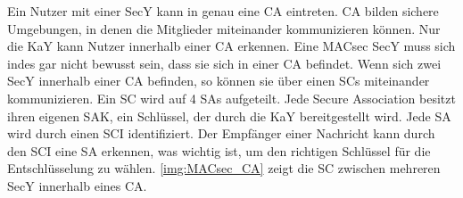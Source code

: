 Ein Nutzer mit einer \gls{SecY} kann in genau eine \gls{CA} eintreten. \gls{CA} bilden sichere Umgebungen, in denen die Mitglieder miteinander kommunizieren können. Nur die \gls{KaY} kann Nutzer innerhalb einer \gls{CA} erkennen. Eine \gls{MACsec} \gls{SecY} muss sich indes gar nicht bewusst sein, dass sie sich in einer \gls{CA} befindet. Wenn sich zwei \gls{SecY} innerhalb einer \gls{CA} befinden, so können sie über einen \glspl{SC} miteinander kommunizieren. Ein \gls{SC} wird auf 4 \glspl{SA} aufgeteilt. Jede Secure Association besitzt ihren eigenen \gls{SAK}, ein Schlüssel, der durch die \gls{KaY} bereitgestellt wird. Jede \gls{SA} wird durch einen \gls{SCI} identifiziert. Der Empfänger einer Nachricht kann durch den \gls{SCI} eine \gls{SA} erkennen, was wichtig ist, um den richtigen Schlüssel für die Entschlüsselung zu wählen.
 \ref{img:MACsec_CA} zeigt die \gls{SC} zwischen mehreren \gls{SecY} innerhalb eines \gls{CA}.
